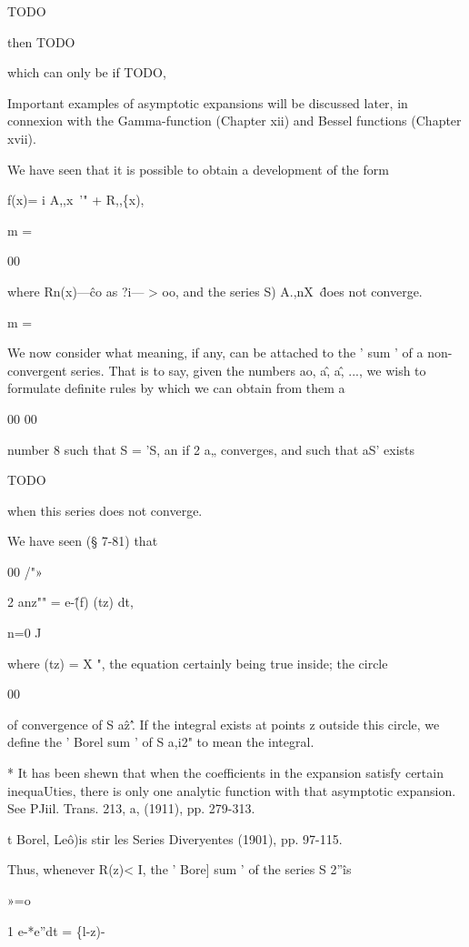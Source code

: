 TODO

then TODO

which can only be if TODO,

Important examples of asymptotic expansions will be discussed later,
in connexion with the Gamma-function (Chapter xii) and Bessel
functions (Chapter xvii).


We have seen that it is possible to obtain a development of the form

f(x)= i A,,x~'" + R,,\{x),

m =

00

where Rn(x)—\^ co as ?i— > oo, and the series S) A.,nX~\^ does not
converge.

m =

We now consider what meaning, if any, can be attached to the ' sum '
of a non- convergent series. That is to say, given the numbers ao,
a\^, a\^, ..., we wish to formulate definite rules by which we can
obtain from them a

00 00

number 8 such that S = 'S, an if 2 a„ converges, and such that aS'
exists

TODO

when this series does not converge.

 We have seen (§ 7-81) that

00 /"»

2 anz"" = e-\^(f) (tz) dt,

n=0 J

where (tz) = X ", the equation certainly being true inside; the
circle

00

of convergence of S a\^z'\^. If the integral exists at points z
outside this circle, we define the ' Borel sum ' of S a,i2" to mean
the integral.

* It has been shewn that when the coefficients in the expansion
satisfy certain inequaUties, there is only one analytic function with
that asymptotic expansion. See PJiil. Trans. 213, a, (1911), pp.
279-313.

t Borel, Le\^o)is stir les Series Diveryentes (1901), pp. 97-115.

% 
% 

Thus, whenever R(z)< I, the ' Bore] sum ' of the series S 2''\^ is

»=o

1 e-*e''dt = \{l-z)-\

